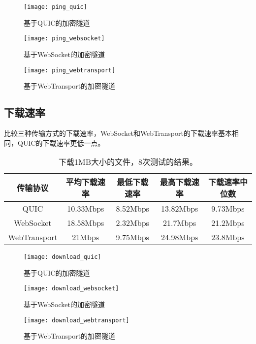 \begin{figure}[H]
  \centering
  \texttt{[image: ping\_quic]}
  \caption{基于QUIC的加密隧道}
\end{figure}

\begin{figure}[H]
  \centering
  \texttt{[image: ping\_websocket]}
  \caption{基于WebSocket的加密隧道}
\end{figure}

\begin{figure}[H]
  \centering
  \texttt{[image: ping\_webtransport]}
  \caption{基于WebTransport的加密隧道}
\end{figure}


\subsection{下载速率}
比较三种传输方式的下载速率，WebSocket和WebTransport的下载速率基本相同，QUIC的下载速率更低一点。

\begin{table}[H]
  \begin{tabular}{|c|c|c|c|c|}
  \hline
  传输协议 & 平均下载速率 & 最低下载速率 & 最高下载速率 & 下载速率中位数  \\ \hline        
  QUIC & 10.33Mbps & 8.52Mbps & 13.82Mbps & 9.73Mbps \\ \hline    
  WebSocket & 18.58Mbps & 2.32Mbps & 21.7Mbps & 21.2Mbps \\ \hline          
  WebTransport & 21Mbps & 9.75Mbps & 24.98Mbps & 23.8Mbps \\ \hline         
  \end{tabular}
  \caption{下载1MB大小的文件，8次测试的结果。}
\end{table}

\begin{figure}[H]
  \centering
  \texttt{[image: download\_quic]}
  \caption{基于QUIC的加密隧道}
\end{figure}

\begin{figure}[H]
  \centering
  \texttt{[image: download\_websocket]}
  \caption{基于WebSocket的加密隧道}
\end{figure}

\begin{figure}[H]
  \centering
  \texttt{[image: download\_webtransport]}
  \caption{基于WebTransport的加密隧道}
\end{figure}


